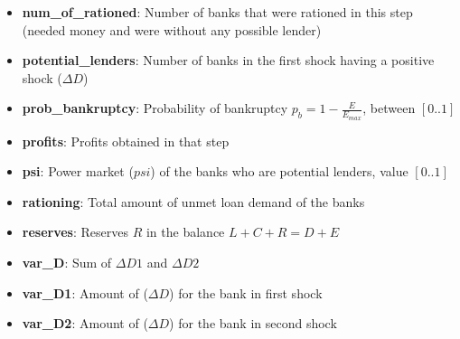 \documentclass{article}
\begin{document}
\begin{itemize}
    \item \textbf{num\_of\_rationed}: Number of banks that were rationed in this step (needed money and were without any possible lender)
    \item \textbf{potential\_lenders}: Number of banks in the first shock having a positive shock ($ \Delta D$)
    \item \textbf{prob\_bankruptcy}: Probability of bankruptcy $p_b=1-\frac{E}{E_{max}}$, between $[0..1]$
    \item \textbf{profits}: Profits obtained in that step
    \item \textbf{psi}: Power market ($psi$) of the banks who are potential lenders, value $[0..1]$
    \item \textbf{rationing}: Total amount of unmet loan demand of the banks
    \item \textbf{reserves}: Reserves $R$ in the balance $L + C + R = D + E$
    \item \textbf{var\_D}: Sum of $ \Delta D1$ and $\Delta D2$ 
    \item \textbf{var\_D1}: Amount of ($ \Delta D$) for the bank in first shock
    \item \textbf{var\_D2}: Amount of ($ \Delta D$) for the bank in second shock    


\end{itemize}
\end{document}
